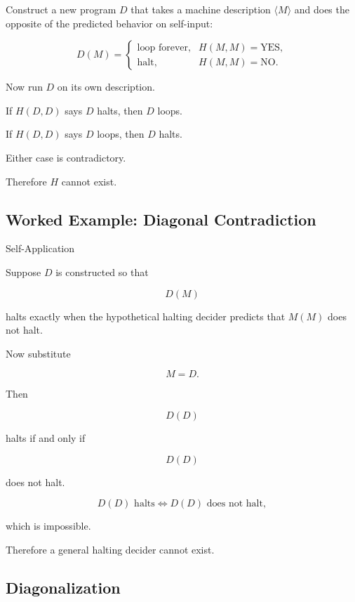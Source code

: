 Construct a new program \(D\) that takes a machine description
\(\langle M\rangle\) and does the opposite of the predicted behavior on
self-input:

\[
\boxed{
D(M)
=
\begin{cases}
\text{loop forever},&H(M,M)=\text{YES},\\
\text{halt},&H(M,M)=\text{NO}.
\end{cases}
}
\]

Now run \(D\) on its own description.

If \(H(D,D)\) says \(D\) halts, then \(D\) loops.

If \(H(D,D)\) says \(D\) loops, then \(D\) halts.

Either case is contradictory.

Therefore \(H\) cannot exist.

\subsection{Worked Example: Diagonal Contradiction}
\label{subsec:worked-halting-diagonal}

\begin{workedexamplebox}{Self-Application}

Suppose \(D\) is constructed so that

\[
D(M)
\]

halts exactly when the hypothetical halting decider predicts that \(M(M)\)
does not halt.

Now substitute

\[
M=D.
\]

Then

\[
D(D)
\]

halts if and only if

\[
D(D)
\]

does not halt.

\begin{answerbox}
\[
\boxed{
D(D)
\text{ halts}
\iff
D(D)
\text{ does not halt},
}
\]
\end{answerbox}

which is impossible.

Therefore a general halting decider cannot exist.

\end{workedexamplebox}

\subsection{Diagonalization}
\label{subsec:computability-diagonalization}


